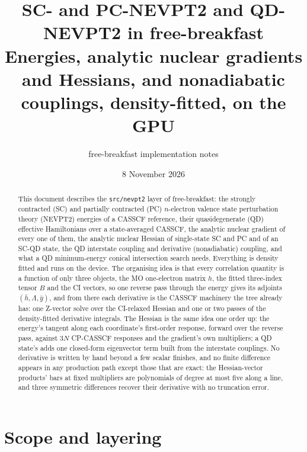 \documentclass[11pt]{article}
\title{SC- and PC-NEVPT2 and QD-NEVPT2 in free-breakfast\\
\large Energies, analytic nuclear gradients and Hessians, and nonadiabatic
couplings, density-fitted, on the GPU}
\author{free-breakfast implementation notes}
\date{8 November 2026}
\newcommand{\code}[1]{\texttt{#1}}
\newcommand{\hb}{\bar h}
\newcommand{\Lb}{\Lambda}
\begin{document}
\sloppy
\maketitle

\begin{abstract}
This document describes the \code{src/nevpt2} layer of free-breakfast: the
strongly contracted (SC) and partially contracted (PC) $n$-electron valence
state perturbation theory (NEVPT2) energies of a CASSCF reference, their
quasidegenerate (QD) effective Hamiltonians over a state-averaged CASSCF,
the analytic nuclear gradient of every one of them, the analytic nuclear
Hessian of single-state SC and PC and of an SC-QD state, the QD interstate
coupling and derivative (nonadiabatic) coupling, and what a QD
minimum-energy conical intersection search needs. Everything is density
fitted and runs on the device. The organising idea is that every
correlation quantity is a function of only three objects, the MO
one-electron matrix $h$, the fitted three-index tensor $B$ and the CI
vectors, so one reverse pass through the energy gives its adjoints
$(\hb, \Lb, \bar y)$, and from there each derivative is the CASSCF
machinery the tree already has: one Z-vector solve over the CI-relaxed
Hessian and one or two passes of the density-fitted derivative integrals.
The Hessian is the same idea one order up: the energy's tangent along each
coordinate's first-order response, forward over the reverse pass, against
$3N$ CP-CASSCF responses and the gradient's own multipliers; a QD state's
adds one closed-form eigenvector term built from the interstate couplings.
No derivative is written by hand beyond a few scalar finishes, and no
finite difference appears in any production path except those that are
exact: the Hessian-vector products' bars at fixed multipliers are
polynomials of degree at most five along a line, and three symmetric
differences recover their derivative with no truncation error.
\end{abstract}

\tableofcontents

\section{Scope and layering}
\label{sec:scope}
\end{document}
